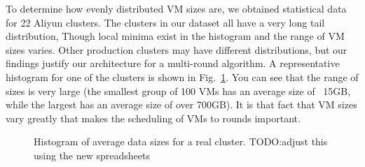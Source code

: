 To determine how evenly distributed VM sizes are, we obtained statistical data
for 22 Aliyun clusters. The clusters in our dataset all have a very long tail distribution,
Though local minima exist in the histogram and the range of VM sizes varies. Other production clusters
may have different distributions, but our findings justify our architecture for a multi-round algorithm.
A representative histogram for one of the clusters is shown in Fig.~\ref{fig:hist-1}. You can see that the range of sizes is very large (the smallest group of 100 VMs has an average size of ~15GB, while the largest has an average size of over 700GB). It is that fact that VM sizes vary greatly that makes the scheduling of VMs to rounds important.


\begin{figure}[ht]
  \centering
  \caption{Histogram of average data sizes for a real cluster. TODO:adjust this using the new spreadsheets}
  \label{fig:hist-1}
\end{figure}


